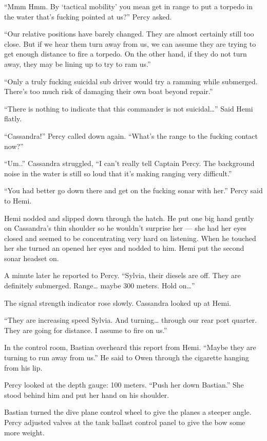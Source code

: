 \documentclass[]{scrbook}
\begin{document}
``Mmm Hmm. By `tactical mobility' you mean get in range to put a torpedo
in the water that's fucking pointed at us?'' Percy asked.

``Our relative positions have barely changed. They are almost certainly
still too close. But if we hear them turn away from us, we can assume
they are trying to get enough distance to fire a torpedo. On the other
hand, if they do not turn away, they may be lining up to try to ram
us.''

``Only a truly fucking suicidal sub driver would try a ramming while
submerged. There's too much risk of damaging their own boat beyond
repair.''

``There is nothing to indicate that this commander is not
suicidal\ldots{}'' Said Hemi flatly.

``Cassandra!'' Percy called down again. ``What's the range to the
fucking contact now?''

``Um..'' Cassandra struggled, ``I can't really tell Captain Percy. The
background noise in the water is still so loud that it's making ranging
very difficult.''

``You had better go down there and get on the fucking sonar with her.''
Percy said to Hemi.

Hemi nodded and slipped down through the hatch. He put one big hand
gently on Cassandra's thin shoulder so he wouldn't surprise her --- she
had her eyes closed and seemed to be concentrating very hard on
listening. When he touched her she turned an opened her eyes and nodded
to him. Hemi put the second sonar headset on.

A minute later he reported to Percy. ``Sylvia, their diesels are off.
They are definitely submerged. Range\ldots{} maybe 300 meters. Hold
on\ldots{}''

The signal strength indicator rose slowly. Cassandra looked up at Hemi.

``They are increasing speed Sylvia. And turning\ldots{} through our rear
port quarter. They are going for distance. I assume to fire on us.''

In the control room, Bastian overheard this report from Hemi. ``Maybe
they are turning to run away from us.'' He said to Owen through the
cigarette hanging from his lip.

Percy looked at the depth gauge: 100 meters. ``Push her down Bastian.''
She stood behind him and put her hand on his shoulder.

Bastian turned the dive plane control wheel to give the planes a steeper
angle. Percy adjusted valves at the tank ballast control panel to give
the bow some more weight.
\end{document}
